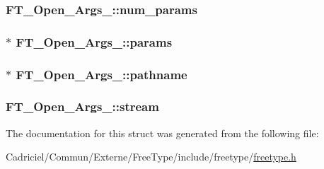 \hypertarget{struct_f_t___open___args___afaf47d9e1631f2147b696fd7f5a6f4eb}{
\subsubsection[{num\-\_\-params}]{ F\-T\-\_\-\-Open\-\_\-\-Args\-\_\-\-::num\-\_\-params}}\label{struct_f_t___open___args___afaf47d9e1631f2147b696fd7f5a6f4eb}
\hypertarget{struct_f_t___open___args___a77b279a34beba29bc14901926f79818f}{
\subsubsection[{params}]{$\ast$ F\-T\-\_\-\-Open\-\_\-\-Args\-\_\-\-::params}}\label{struct_f_t___open___args___a77b279a34beba29bc14901926f79818f}
\hypertarget{struct_f_t___open___args___aea3d454d9fd9bb7434aad07e651d027b}{
\subsubsection[{pathname}]{$\ast$ F\-T\-\_\-\-Open\-\_\-\-Args\-\_\-\-::pathname}}\label{struct_f_t___open___args___aea3d454d9fd9bb7434aad07e651d027b}
\hypertarget{struct_f_t___open___args___ae1e6444bf0c21b323ce6cbe8bc475b2b}{
\subsubsection[{stream}]{ F\-T\-\_\-\-Open\-\_\-\-Args\-\_\-\-::stream}}\label{struct_f_t___open___args___ae1e6444bf0c21b323ce6cbe8bc475b2b}


The documentation for this struct was generated from the following file\-:\begin{DoxyCompactItemize}
\item 
Cadriciel/\-Commun/\-Externe/\-Free\-Type/include/freetype/\hyperlink{freetype_8h}{freetype.\-h}\end{DoxyCompactItemize}
